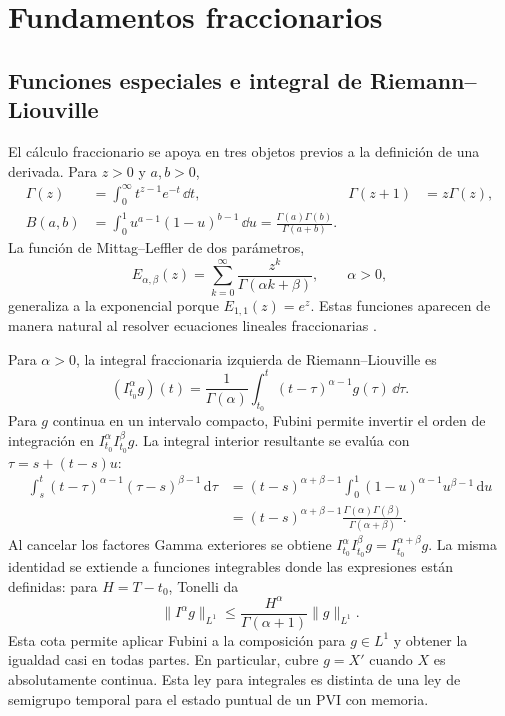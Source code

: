 \ifdefined\HAFOFractionalBlockOperators
\section{Fundamentos fraccionarios}
\label{sec:fundamentos}

\HAFOCardFractional

\subsection{Funciones especiales e integral de Riemann--Liouville}

El cálculo fraccionario se apoya en tres objetos previos a la definición de una
derivada. Para \(z>0\) y \(a,b>0\),
\begin{align}
 \Gamma(z)&=\int_0^\infty t^{z-1}e^{-t}\,\dd t,
 &\Gamma(z+1)&=z\Gamma(z),\label{eq:gamma-fractional}\\
 B(a,b)&=\int_0^1 u^{a-1}(1-u)^{b-1}\,\dd u
 =\frac{\Gamma(a)\Gamma(b)}{\Gamma(a+b)}.\label{eq:beta-gamma}
\end{align}
La función de Mittag--Leffler de dos parámetros,
\begin{equation}
 E_{\alpha,\beta}(z)=\sum_{k=0}^{\infty}
 \frac{z^k}{\Gamma(\alpha k+\beta)},
 \qquad \alpha>0,
 \label{eq:mittag-leffler-definition}
\end{equation}
generaliza a la exponencial porque \(E_{1,1}(z)=e^z\). Estas funciones
aparecen de manera natural al resolver ecuaciones lineales fraccionarias
\cite{Podlubny1999,Monje2010,Oliveira2019SolvedFractional}.

Para \(\alpha>0\), la integral fraccionaria izquierda de
Riemann--Liouville es
\begin{equation}
 (I_{t_0}^{\alpha}g)(t)=\frac{1}{\Gamma(\alpha)}
 \int_{t_0}^{t}(t-\tau)^{\alpha-1}g(\tau)\,\dd\tau.
 \label{eq:rl-integral}
\end{equation}
Para \(g\) continua en un intervalo compacto, Fubini permite invertir el
orden de integración en \(I_{t_0}^{\alpha}I_{t_0}^{\beta}g\). La integral
interior resultante se evalúa con \(\tau=s+(t-s)u\):
\begin{align*}
 \int_s^t(t-\tau)^{\alpha-1}(\tau-s)^{\beta-1}\,\mathrm d\tau
 &=(t-s)^{\alpha+\beta-1}
   \int_0^1(1-u)^{\alpha-1}u^{\beta-1}\,\mathrm du\\
 &=(t-s)^{\alpha+\beta-1}
   \frac{\Gamma(\alpha)\Gamma(\beta)}{\Gamma(\alpha+\beta)}.
\end{align*}
Al cancelar los factores Gamma exteriores se obtiene
\(I_{t_0}^{\alpha}I_{t_0}^{\beta}g=I_{t_0}^{\alpha+\beta}g\).
La misma identidad se extiende a funciones integrables donde las expresiones
están definidas: para $H=T-t_0$, Tonelli da
\[
 \|I^\alpha g\|_{L^1}\leq
 \frac{H^\alpha}{\Gamma(\alpha+1)}\|g\|_{L^1}.
\]
Esta cota permite aplicar Fubini a la composición para $g\in L^1$ y obtener
la igualdad casi en todas partes. En particular, cubre $g=X'$ cuando $X$ es
absolutamente continua. Esta ley para integrales es distinta de
una ley de semigrupo temporal para el estado puntual de un PVI con memoria.

